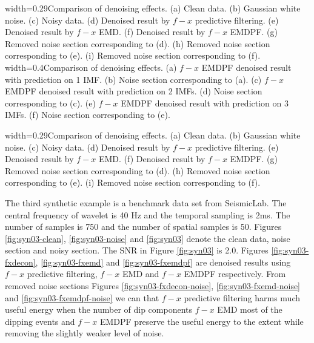{width=0.29\textwidth}{Comparison of denoising effects. (a) Clean data. (b) Gaussian white noise. (c) Noisy data. (d) Denoised result by $f-x$ predictive filtering. (e) Denoised result by $f-x$ EMD. (f) Denoised result by $f-x$ EMDPF. (g) Removed noise section corresponding to (d). (h) Removed noise section corresponding to (e). (i) Removed noise section corresponding to (f).}
{width=0.4\textwidth}{Comparison of denoising effects. (a) $f-x$ EMDPF denoised result with prediction on 1 IMF. (b) Noise section corresponding to (a). (c) $f-x$ EMDPF denoised result with prediction on 2 IMFs. (d) Noise section corresponding to (c). (e) $f-x$ EMDPF denoised result with prediction on 3 IMFs. (f) Noise section corresponding to (e).}

{width=0.29\textwidth}{Comparison of denoising effects. (a) Clean data. (b) Gaussian white noise. (c) Noisy data. (d) Denoised result by $f-x$ predictive filtering. (e) Denoised result by $f-x$ EMD. (f) Denoised result by $f-x$ EMDPF. (g) Removed noise section corresponding to (d). (h) Removed noise section corresponding to (e). (i) Removed noise section corresponding to (f).}

The third synthetic example is a benchmark data set from SeismicLab. The central frequency of   wavelet is 40 Hz and the temporal sampling is 2\wen{ }ms. The number of  samples is 750 and the number of spatial samples is 50. Figures \ref{fig:syn03-clean}, \ref{fig:syn03-noise}\wen{,} and \ref{fig:syn03} denote the clean data, noise section\wen{,} and noisy section. The SNR in Figure \ref{fig:syn03} is  2.0. Figures \ref{fig:syn03-fxdecon}, \ref{fig:syn03-fxemd}\wen{,} and \ref{fig:syn03-fxemdpf} are  denoised results using $f-x$ predictive filtering, $f-x$ EMD\wen{,} and $f-x$ EMDPF\wen{,} respectively. From removed noise sections Figures \ref{fig:syn03-fxdecon-noise}, \ref{fig:syn03-fxemd-noise}\wen{,} and \ref{fig:syn03-fxemdpf-noise} we can  that $f-x$ predictive filtering harms much useful energy when the number of dip components   $f-x$ EMD  most of the dipping events\wen{,} and $f-x$ EMDPF preserve the useful energy to the  extent while removing the slightly weaker level of noise. 

